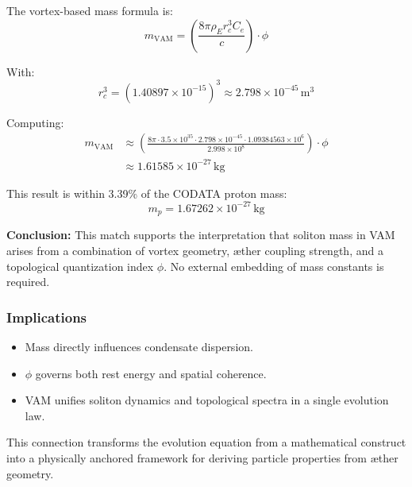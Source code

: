\documentclass[a4paper,12pt]{article}
\begin{document}
            The vortex-based mass formula is:
            \begin{equation}
            m_{\text{VAM}} = \left( \frac{8\pi \rho_E r_c^3 C_e}{c} \right) \cdot \phi
            \end{equation}

            With:
            \begin{equation}
            r_c^3 = (1.40897 \times 10^{-15})^3 \approx 2.798 \times 10^{-45} \, \text{m}^3
            \end{equation}

            Computing:
            \begin{align}
            m_{\text{VAM}} &\approx \left( \frac{8\pi \cdot 3.5 \times 10^{35} \cdot 2.798 \times 10^{-45} \cdot 1.09384563 \times 10^6}{2.998 \times 10^8} \right) \cdot \phi \\
            &\approx 1.61585 \times 10^{-27} \, \text{kg}
            \end{align}

            This result is within 3.39\% of the CODATA proton mass:
            \begin{equation}
            m_p = 1.67262 \times 10^{-27} \, \text{kg}
            \end{equation}

            \textbf{Conclusion:} This match supports the interpretation that soliton mass in VAM arises from a combination of vortex geometry, æther coupling strength, and a topological quantization index $\phi$. No external embedding of mass constants is required.


            \subsubsection*{Implications}

            \begin{itemize}
              \item Mass directly influences condensate dispersion.
              \item $\phi$ governs both rest energy and spatial coherence.
              \item VAM unifies soliton dynamics and topological spectra in a single evolution law.
            \end{itemize}

            This connection transforms the evolution equation from a mathematical construct into a physically anchored framework for deriving particle properties from æther geometry.
\end{document}
